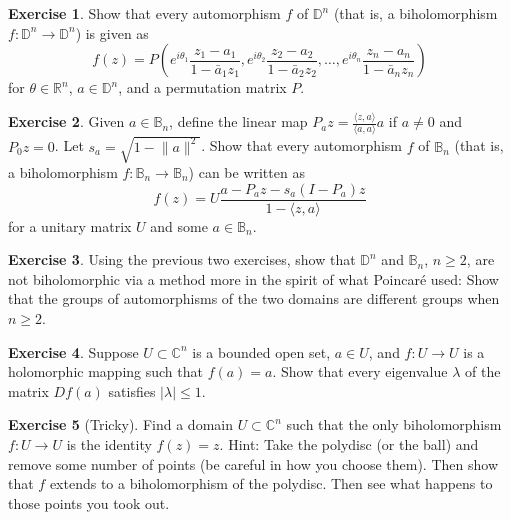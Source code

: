 \documentclass[12pt,openany]{book}
\newcommand{\linnprod}[2]{\langle #1 , #2 \rangle}
\newcommand{\sabs}[1]{\lvert {#1} \rvert}
\newcommand{\snorm}[1]{\lVert {#1} \rVert}
\newcommand{\C}{{\mathbb{C}}}
\newcommand{\R}{{\mathbb{R}}}
\newcommand{\D}{{\mathbb{D}}}
\newcommand{\bB}{{\mathbb{B}}}
\theoremstyle{plain}
\theoremstyle{remark}
\theoremstyle{definition}
\newenvironment{exbox}{%
    \def\FrameCommand{\vrule width 1pt \relax\hspace{10pt}}%
    \MakeFramed{\advance\hsize-\width\FrameRestore}%
}{%
    \endMakeFramed
}
\theoremstyle{exercise}
\newtheorem{exercise}{Exercise}[section]
\theoremstyle{example}
\begin{document}
\begin{exbox}
\begin{exercise}
Show that every automorphism $f$ of $\D^n$ (that is, a biholomorphism $f \colon \D^n \to \D^n$)
is given as
\begin{equation*}
f(z) = P \left(
e^{i\theta_1} \frac{z_1-a_1}{1-\bar{a}_1z_1} ,
e^{i\theta_2} \frac{z_2-a_2}{1-\bar{a}_2z_2} , \ldots,
e^{i\theta_n} \frac{z_n-a_n}{1-\bar{a}_nz_n} \right)
\end{equation*}
for $\theta \in \R^n$, $a \in \D^n$, and
a permutation matrix $P$.
\end{exercise}

\begin{exercise}
Given $a \in \bB_n$, define the linear map $P_a z =
\frac{\linnprod{z}{a}}{\linnprod{a}{a}}a$ if $a \not= 0$ and $P_0z = 0$.
Let $s_a = \sqrt{1-\snorm{a}^2}$.  Show that every automorphism $f$ of
$\bB_n$ (that is, a biholomorphism $f \colon \bB_n \to \bB_n$)
can be written as
\begin{equation*}
f(z) = U \frac{a-P_az-s_a(I-P_a)z}{1-\linnprod{z}{a}}
\end{equation*}
for a unitary matrix $U$ and some $a \in \bB_n$.
\end{exercise}

\begin{exercise}
Using the previous two exercises, show that $\D^n$ and $\bB_n$, $n \geq 2$,
are not biholomorphic via a method more in the spirit of what Poincar\'e
used: Show that the groups of automorphisms of the two domains are
different groups when $n \geq 2$.
\end{exercise}

\begin{exercise} \label{exercise:boundedeigen}
Suppose $U \subset \C^n$ is a bounded open set, $a \in U$, and $f \colon U \to U$ is a
holomorphic mapping such that $f(a) = a$.  Show that every eigenvalue
$\lambda$ of the matrix $Df(a)$ satisfies $\sabs{\lambda} \leq 1$.
\end{exercise}

\begin{exercise}[Tricky]
Find a domain $U \subset \C^n$ such that the only biholomorphism $f \colon U
\to U$ is the identity $f(z) = z$.  Hint: Take the polydisc (or the ball)
and remove some number of points (be careful in how you choose them).  Then
show that $f$ extends to a biholomorphism of the polydisc.  Then see what
happens to those points you took out.
\end{exercise}


\end{exbox}
\end{document}
